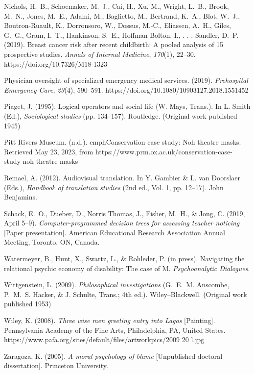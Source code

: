 \documentclass[]{interact}
\theoremstyle{plain}%
\theoremstyle{definition}
\theoremstyle{remark}
\begin{document}
\begin{thebibliography}{}
Nichols, H.~B., Schoemaker, M.~J., Cai, H., Xu, M., Wright, L.~B., Brook, M.~N., Jones,
M.~E., Adami, M., Baglietto, M., Bertrand, K.~A., Blot, W.~J., Boutron-Ruault, K., Dorronsoro,
W., Dossus, M.-C., Eliassen, A.~H., Giles, G.~G., Gram, I.~T., Hankinson, S.~E.,
Hoffman-Bolton, I., . . . Sandler, D.~P. (2019). Breast cancer risk after recent childbirth:
A pooled analysis of 15 prospective studies. \emph{Annals of Internal Medicine}, \emph{170}(1), 22--30.
https://doi.org/10.7326/M18-1323

Physician oversight of specialized emergency medical services. (2019). \emph{Prehospital Emergency
Care}, \emph{23}(4), 590--591. https://doi.org/10.1080/10903127.2018.1551452

Piaget, J. (1995). Logical operators and social life (W. Mays, Trans.). In L. Smith (Ed.),
\emph{Sociological studies} (pp. 134--157). Routledge. (Original work published 1945)

Pitt Rivers Museum. (n.d.). emph{Conservation case study: Noh theatre masks}. Retrieved May 23, 2023, from https://www.prm.ox.ac.uk/conservation-case-study-noh-theatre-masks

Remael, A. (2012). Audiovisual translation. In Y. Gambier \& L. van Doorslaer (Eds.),
\emph{Handbook of translation studies} (2nd ed., Vol. 1, pp. 12--17). John Benjamins.

Schack, E.~O., Dueber, D., Norris Thomas, J., Fisher, M.~H., \& Jong, C. (2019, April 5--9).
\emph{Computer-programmed decision trees for assessing teacher noticing} [Paper presentation].
American Educational Research Association Annual Meeting, Toronto, ON, Canada.

Watermeyer, B., Hunt, X., Swartz, L., \& Rohleder, P. (in press). Navigating the relational
psychic economy of disability: The case of M. \emph{Psychoanalytic Dialogues}.

Wittgenstein, L. (2009). \emph{Philosophical investigations} (G.~E.~M. Anscombe, P.~M.~S. Hacker,
\& J. Schulte, Trans.; 4th ed.). Wiley–Blackwell. (Original work published 1953)

Wiley, K. (2008). \emph{Three wise men greeting entry into Lagos} [Painting]. Pennsylvania Academy of the Fine Arts, Philadelphia, PA, United States. https://www.pafa.org/sites/default/files/artworkpics/2009 20 l.jpg

Zaragoza, K. (2005). \emph{A moral psychology of blame} [Unpublished doctoral dissertation]. Princeton
University.

\end{thebibliography}
\end{document}
